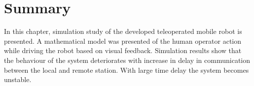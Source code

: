 \section{Summary}
In this chapter, simulation study of the developed teleoperated mobile robot is presented. A mathematical model was presented of the  human operator action while driving the robot based on visual feedback. Simulation results show that the behaviour of the system deteriorates with increase in delay in communication between the local and remote station. With large time delay the system becomes unstable.

